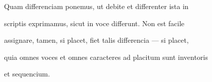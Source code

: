 Quam differenciam ponemus, ut debite et differenter ista in 

scriptis exprimamus, sicut in voce differunt. Non est facile 

assignare, tamen, si placet, fiet talis differencia — si placet,




\fullpreviouslines

{
\color{blue}
quia omnes voces et omnes caracteres ad placitum sunt inventoris

et sequencium.

}


\endinput






Non est facile 

assignare, tamen, si placet, fiet talis differencia — si placet,

60:
eo \y rkp.: quantocius.


\catcode `\^^M=5

  \newtip{48}{Łoś niesłusznie uważa, że \textit{bika} w obu wypadkach
    napisano błędnie zamiast \textit{ƀyka}. Przykłady są bowiem podane
    w~pisowni dotychczasowej dla pokazania jej niewystarczalności do
    zróżnicowania wyrazów \textit{bika} i \textit{byka}.} 

\obeylines




\newcommand{\margin}[1]{\annotatetextBlue{\{#1\}}{zapisy na marginesie}}



\renewcommand{\over}[1]{\annotatetextBlue{\{#1\}}{zapisy nad rządkami}}

\newcommand{\add}[1]{\annotatetextOlive{<#1>}{litery i wyrazy dodane, (których w tekście brak)}}

\newcommand{\extra}[1]{\colorbox{magenta!10}{[#1]}}

\newcommand{\overstr}[1]{\annotatetextMagenta{⟦#1⟧}{przekreślenia}}



